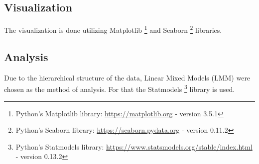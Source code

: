 \subsection{Visualization}

The visualization is done utilizing Matplotlib \footnote{Python's Matplotlib library: \href{https://matplotlib.org}{https://matplotlib.org} - version 3.5.1} and Seaborn \footnote{Python's Seaborn library: \href{https://seaborn.pydata.org}{https://seaborn.pydata.org} - version 0.11.2} libraries.

\subsection{Analysis}
Due to the hierarchical structure of the data, Linear Mixed Models (LMM) were chosen as the method of analysis. For that the Statmodels \footnote{Python's Statmodels library: \href{https://www.statsmodels.org/stable/index.html}{https://www.statsmodels.org/stable/index.html} - version 0.13.2} library is used.


